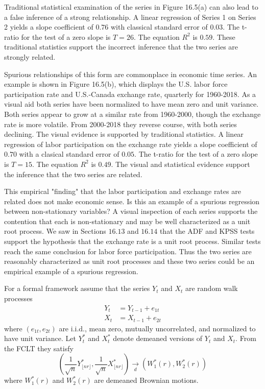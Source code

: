 \documentclass[10pt]{article}
\begin{document}
Traditional statistical examination of the series in Figure 16.5(a) can also lead to a false inference of a strong relationship. A linear regression of Series 1 on Series 2 yields a slope coefficient of $0.76$ with classical standard error of $0.03$. The t-ratio for the test of a zero slope is $T=26$. The equation $R^{2}$ is $0.59$. These traditional statistics support the incorrect inference that the two series are strongly related.

Spurious relationships of this form are commonplace in economic time series. An example is shown in Figure 16.5(b), which displays the U.S. labor force participation rate and U.S.-Canada exchange rate, quarterly for 1960-2018. As a visual aid both series have been normalized to have mean zero and unit variance. Both series appear to grow at a similar rate from 1960-2000, though the exchange rate is more volatile. From 2000-2018 they reverse course, with both series declining. The visual evidence is supported by traditional statistics. A linear regression of labor participation on the exchange rate yields a slope coefficient of $0.70$ with a clasical standard error of $0.05$. The t-ratio for the test of a zero slope is $T=15$. The equation $R^{2}$ is $0.49$. The visual and statistical evidence support the inference that the two series are related.

This empirical "finding" that the labor participation and exchange rates are related does not make economic sense. Is this an example of a spurious regression between non-stationary variables? A visual inspection of each series supports the contention that each is non-stationary and may be well characterized as a unit root process. We saw in Sections $16.13$ and $16.14$ that the ADF and KPSS tests support the hypothesis that the exchange rate is a unit root process. Similar tests reach the same conclusion for labor force participation. Thus the two series are reasonably characterized as unit root processes and these two series could be an empirical example of a spurious regression.

For a formal framework assume that the series $Y_{t}$ and $X_{t}$ are random walk processes
$$
\begin{aligned}
Y_{t} &=Y_{t-1}+e_{1 t} \\
X_{t} &=X_{t-1}+e_{2 t}
\end{aligned}
$$
where $\left(e_{1 t}, e_{2 t}\right)$ are i.i.d., mean zero, mutually uncorrelated, and normalized to have unit variance. Let $Y_{t}^{*}$ and $X_{t}^{*}$ denote demeaned versions of $Y_{t}$ and $X_{t}$. From the FCLT they satisfy
$$
\left(\frac{1}{\sqrt{n}} Y_{\lfloor n r\rfloor}^{*}, \frac{1}{\sqrt{n}} X_{\lfloor n r\rfloor}^{*}\right) \underset{d}{\longrightarrow}\left(W_{1}^{*}(r), W_{2}^{*}(r)\right)
$$
where $W_{1}^{*}(r)$ and $W_{2}^{*}(r)$ are demeaned Brownian motions.
\end{document}
